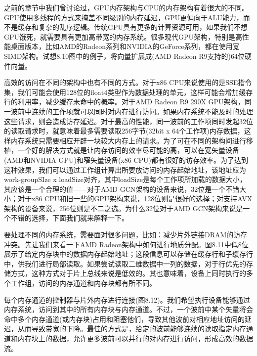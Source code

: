之前的章节中我们曾讨论过，GPU内存架构与CPU的内存架构有着很大的不同。GPU使用多线程的方式来掩盖不同级别的内存延迟，GPU更偏向于ALU能力，而不是缓存和复杂的乱序逻辑。传统GPU具有更多的计算资源可用，如果我们不想GPU饿死，就需要具有更加高带宽的内存系统。很多现代GPU架构，特别是高性能桌面版本，比如AMD的Radeon系列和NVIDIA的GeForce系列，都在使用宽SIMD架构。试想8.10图中的例子，将向量扩展成(AMD Radeon R9支持的)64位硬件向量。

高效的访问在不同的架构中也有不同的方式。对于x86 CPU来说使用的是SSE指令集，我们可能会使用128位的float4类型作为数据处理的单元，这样可能会增加缓存行的利用率，减少缓存未命中的概率。对于AMD Radeon R9 290X GPU架构，同一波前中连续的工作项就可以同时对内存进行访问。如果内存系统不能及时的处理这些请求，则会造成访存延迟。对于最高的性能，同一波前的工作项同时发起32位的读取请求时，就意味着最多需要读取256字节(32bit x 64个工作项)内存数据，这样内存系统只需要相应开辟一块较大内存上的请求。为了可在不同的架构间进行移植，一个好的解决方式就是让内存访问的效率尽可能的高，可以在宽矢量设备(AMD和NVIDIA GPU)和窄矢量设备(x86 CPU)都有很好的访存效率。为了达到这种效果，我们可以通过工作组计算出所要放访问的内存起始地址，该地址应为work-groupSIze x loadSize对齐，其中loadSize是每个工作项所加载的数据大小，其应该是一个合理的值——对于AMD GCN架构的设备来说，32位是一个不错大小；对于x86 CPU和旧一些的GPU架构来说，128位则是很好的选择；对支持AVX架构的设备来说，256位则是不二之选。为什么32位对于AMD GCN架构来说是一个不错的选择，下面我们就来解释一下。

要处理不同的内存系统，需要面对很多问题，比如：减少片外链接DRAM的访存冲突。先让我们来看一下AMD Radeon架构中如何进行地质分配。图8.11中低8位展示了给定内存块中的数据内存起始地址；这段信息可以存储在缓存行和子缓存行中，供我们进行局部读取。如果尝试读取二维数据中一列的数据，对于行优先的存储方式，这种方式对于片上总线来说是低效的。其也意味着，设备上同时执行的多个工作组，访问的内存通道和内存块都有所不同。



每个内存通道的控制器与片外内存进行连接(图8.12)。我们希望执行设备能够通过内存系统，访问到其中的所有内存块与内存通道。不过，一个波前中某个矢量将会命中多个内存通道(或内存块)占用和阻塞他们，导致其他波前对相应地址访问的延迟，从而导致带宽的下降。最佳的方式是，给定的波前能够连续的读取指定内存通道和内存块上的数据，允许更多波前可以并行的对内存进行访问，形成高效的数据流。


